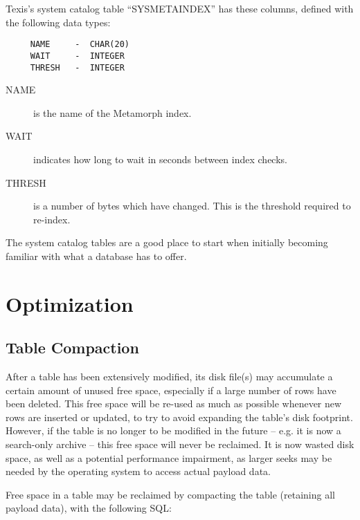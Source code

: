 Texis's system catalog table ``SYSMETAINDEX'' has these columns,
defined with the following data types:

\begin{verbatim}
     NAME     -  CHAR(20)
     WAIT     -  INTEGER
     THRESH   -  INTEGER
\end{verbatim}

\begin{description}

\item[NAME] is the name of the Metamorph index.

\item[WAIT] indicates how long to wait in seconds between index
checks.

\item[THRESH] is a number of bytes which have changed.  This is the
threshold required to re-index.
\end{description}

The system catalog tables are a good place to start when initially
becoming familiar with what a database has to offer.

\section{Optimization}

\subsection{Table Compaction}

  After a table has been extensively modified, its disk file(s) may
accumulate a certain amount of unused free space, especially if a
large number of rows have been deleted.  This free space will be
re-used as much as possible whenever new rows are inserted or updated,
to try to avoid expanding the table's disk footprint.  However, if the
table is no longer to be modified in the future -- e.g. it is now a
search-only archive -- this free space will never be reclaimed.  It is
now wasted disk space, as well as a potential performance impairment,
as larger seeks may be needed by the operating system to access actual
payload data.

  Free space in a table may be reclaimed by compacting the table
(retaining all payload data), with the following SQL:

